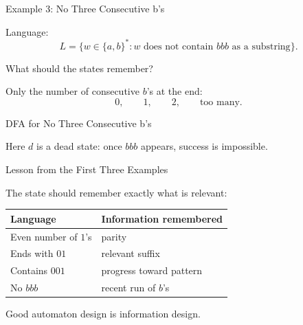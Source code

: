 \documentclass[10pt,aspectratio=169]{beamer}
\begin{document}
\begin{frame}{Example 3: No Three Consecutive b's}

Language:
\[
L=\{w\in\{a,b\}^*: w\text{ does not contain }bbb\text{ as a substring}\}.
\]

\pause

What should the states remember?

\pause

Only the number of consecutive $b$'s at the end:
\[
0,\qquad 1,
\qquad 2,
\qquad \text{too many}.
\]

\end{frame}

\begin{frame}{DFA for No Three Consecutive b's}

\begin{center}
\end{center}

\vspace{0.5em}

Here $d$ is a dead state: once $bbb$ appears, success is impossible.

\end{frame}

\begin{frame}{Lesson from the First Three Examples}

The state should remember exactly what is relevant:

\begin{center}
\begin{tabular}{ll}
\toprule
\textbf{Language} & \textbf{Information remembered}\\
\midrule
Even number of $1$'s & parity\\
Ends with $01$ & relevant suffix\\
Contains $001$ & progress toward pattern\\
No $bbb$ & recent run of $b$'s\\
\bottomrule
\end{tabular}
\end{center}

\pause

Good automaton design is information design.

\end{frame}
\end{document}
